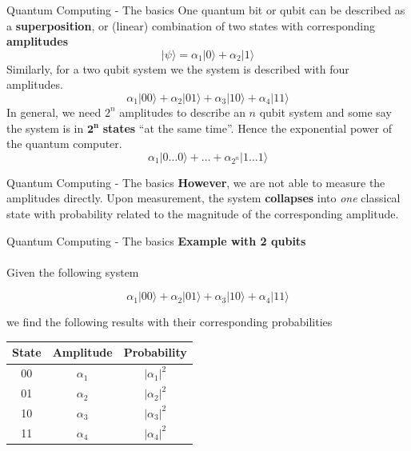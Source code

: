 \documentclass{beamer}
\begin{document}
{\begin{frame}{Quantum Computing - The basics}
One quantum bit or qubit can be described as a \textbf{superposition}, or (linear) combination of two states with corresponding \textbf{amplitudes}
\begin{equation}
	|\psi\rangle = \alpha_1|0\rangle + \alpha_2|1\rangle 
\end{equation}
\pause
Similarly, for a two qubit system we the system is described with four amplitudes.
\begin{equation}
	\alpha_1|00\rangle + \alpha_2|01\rangle + \alpha_3|10\rangle + \alpha_4|11\rangle
\end{equation}
\pause
In general, we need $2^n$ amplitudes to describe an $n$ qubit system and some say the system is in $\mathbf{2^n}$ \textbf{states} ``at the same time''. Hence the exponential power of the quantum computer.
\begin{equation}
	\alpha_1|0\dots 0\rangle + \dots + \alpha_{2^n}|1\dots 1\rangle
\end{equation}
\end{frame}

\begin{frame}{Quantum Computing - The basics}
	\textbf{However}, we are not able to measure the amplitudes directly. Upon measurement, the system \textbf{collapses} into \emph{one} classical state with  probability related to the magnitude of the corresponding amplitude. 
\end{frame}

\begin{frame}{Quantum Computing - The basics}
\textbf{Example with 2 qubits}\\~\\
	Given the following system
	
	\begin{equation}
	\alpha_1|00\rangle + \alpha_2|01\rangle + \alpha_3|10\rangle + \alpha_4|11\rangle
	\end{equation}
	
	we find the following results with their corresponding probabilities
	\begin{table}
		\centering
		\begin{tabular}{||c c c||} 
			\hline
			State & Amplitude & Probability \\ [0.5ex] 
			\hline\hline
			00 & $\alpha_1$ & $|\alpha_1|^2$ \\ 
			01 & $\alpha_2$ & $|\alpha_2|^2$ \\
			10 & $\alpha_3$ & $|\alpha_3|^2$ \\
			11 & $\alpha_4$ & $|\alpha_4|^2$ \\ [1ex] 
			\hline
		\end{tabular}
	\end{table}
\end{frame}

}
\end{document}
